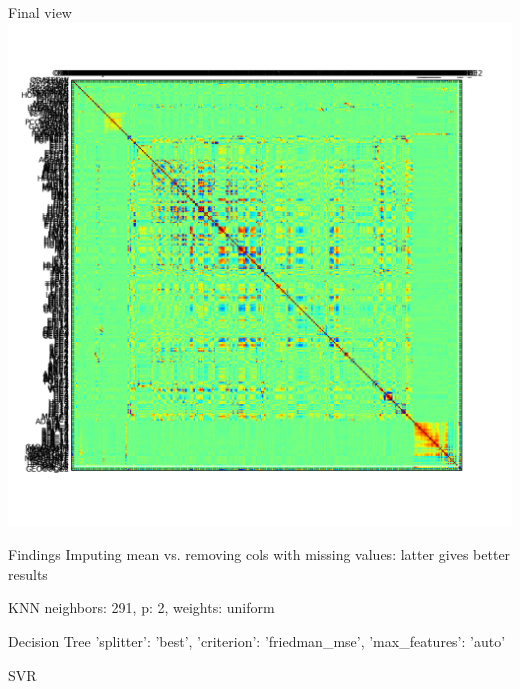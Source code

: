 \documentclass[12pt]{beamer}
\begin{document}
\begin{frame}{Final view}
\includegraphics[height=\textheight,width=\textwidth,keepaspectratio]{plots/kdd_final.png}
\end{frame}

\begin{frame}{Findings}
Imputing mean vs. removing cols with missing values: latter gives better results

\begin{block}{KNN}
neighbors: 291, p: 2, weights: uniform
\end{block}

\begin{block}{Decision Tree}
'splitter': 'best', 'criterion': 'friedman\_mse', 'max\_features': 'auto'
\end{block}

\begin{block}{SVR}

\end{block}
\end{frame}
\end{document}

